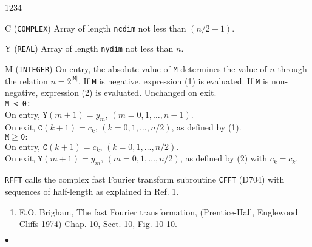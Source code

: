 \newpage
\begin{DLtt}{1234}
\item[C] ({\tt COMPLEX}) Array of length {\tt ncdim} not less than
$(n/2+1)$.
\item[Y] ({\tt REAL}) Array of length {\tt nydim} not less than $n$.
\item[M] ({\tt INTEGER}) On entry, the absolute value of {\tt M}
determines the value of $n$ through the relation $n=2^{\mathtt{|M|}}$.
If {\tt M} is negative, expression (1) is evaluated. If {\tt M} is
non-negative, expression (2) is evaluated. Unchanged on exit. \\
{\tt M < 0:} \\
On entry, $\mathtt{Y}(m+1)=y_m,\,(m=0,1,\ldots,n-1)$.\\
On exit, $\mathtt{C}(k+1)=c_k,\,(k=0,1,\ldots,n/2)$, as defined by
(1). \\
$\mathtt{M \geq 0:}$ \\
On entry, $\mathtt{C}(k+1)=c_k,\,(k=0,1,\ldots,n/2)$. \\
On exit, $\mathtt{Y}(m+1)=y_m,\,(m=0,1,\ldots,n/2)$, as
defined by (2) with $c_k=\bar{c}_k$.
\end{DLtt}
\Method
{\tt RFFT} calls the complex fast Fourier transform subroutine
{\tt CFFT} (D704) with sequences of half-length as explained in Ref. 1.
\Refer
\begin{enumerate}
\item  E.O. Brigham, The fast Fourier transformation,
(Prentice-Hall, Englewood Cliffs 1974) Chap. 10, Sect. 10, Fig. 10-10.
\end{enumerate}
$\bullet$
